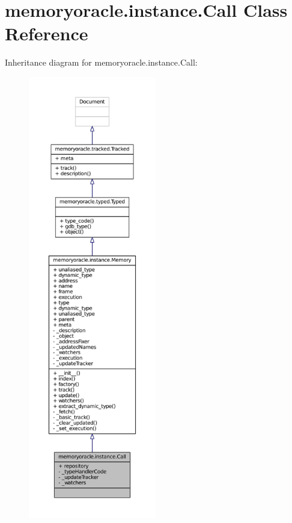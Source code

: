 \hypertarget{classmemoryoracle_1_1instance_1_1Call}{}\section{memoryoracle.\+instance.\+Call Class Reference}
\label{classmemoryoracle_1_1instance_1_1Call}


Inheritance diagram for memoryoracle.\+instance.\+Call\+:
\nopagebreak
\begin{figure}[H]
\begin{center}
\leavevmode
\includegraphics[height=550pt]{classmemoryoracle_1_1instance_1_1Call__inherit__graph}
\end{center}
\end{figure}


